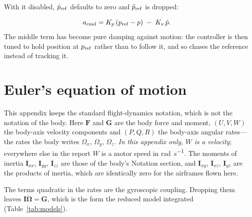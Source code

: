\documentclass[11pt,a4paper]{article}
\begin{document}
With it disabled, $\dot p_{\rm ref}$ defaults to zero and $\ddot p_{\rm ref}$
is dropped:

\[
  a_{\rm cmd} = K_p\,(p_{\rm ref} - p) \;-\; K_v\,\dot p .
\]
The middle term has become pure damping against motion: the controller is then
tuned to hold position at $p_{\rm ref}$ rather than to follow it, and so chases
the reference instead of tracking it.
\section{Euler's equation of motion}\label{sec:euler}

This appendix keeps the standard flight-dynamics notation, which is not the
notation of the body. Here $\boldsymbol{F}$ and $\boldsymbol{G}$ are the body
force and moment, $(U,V,W)$ the body-axis velocity components and $(P,Q,R)$ the
body-axis angular rates---the rates the body writes $\Omega_x$, $\Omega_y$,
$\Omega_z$. \emph{In this appendix only, $W$ is a velocity}; everywhere else in
the report $W$ is a motor speed in \si{\radian\per\second}. The moments of
inertia $\boldsymbol{I}_{xx}$, $\boldsymbol{I}_{yy}$, $\boldsymbol{I}_{zz}$ are
those of the body's Notation section, and $\boldsymbol{I}_{xy}$,
$\boldsymbol{I}_{xz}$, $\boldsymbol{I}_{yz}$ are the products of inertia, which
are identically zero for the airframes flown here.

The terms quadratic in the rates are the gyroscopic coupling. Dropping them
leaves $\boldsymbol{I}\dot{\boldsymbol{\Omega}}=\boldsymbol{G}$, which is the
form the reduced model integrated (Table~\ref{tab:models}).
\end{document}
